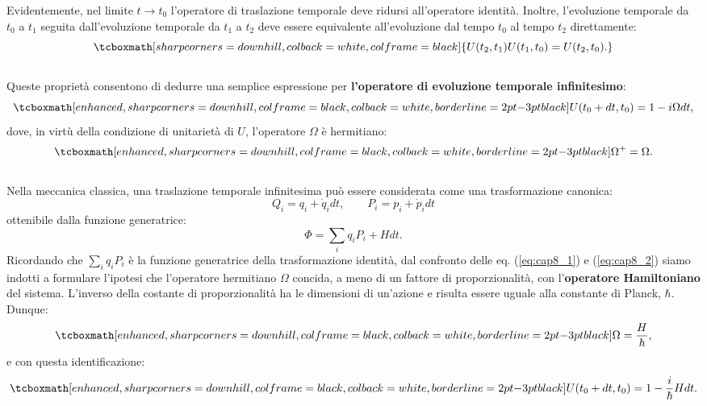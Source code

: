 Evidentemente, nel limite $t\longrightarrow t_0$ l'operatore di traslazione temporale deve ridursi all'operatore identità. Inoltre, l'evoluzione temporale da $t_0$ a $t_1$ seguita dall'evoluzione temporale da $t_1$ a $t_2$ deve essere equivalente all'evoluzione dal tempo $t_0$ al tempo $t_2$ direttamente:
	\begin{equation}
		\tcboxmath[sharp corners=downhill, colback=white, colframe=black]{
			U (t_2,t_1) U(t_1,t_0)=U(t_2,t_0).
			}
	\end{equation}\\
	
Queste proprietà consentono di dedurre una semplice espressione per \textbf{l'operatore di evoluzione temporale infinitesimo}:
	\begin{equation}
		\tcboxmath[enhanced, sharp corners=downhill, colframe=black, colback=white, borderline={2pt}{-3pt}{black}]{
			U(t_0+dt,t_0) = 1-i\Omega dt,
			}
		\label{eq:cap8_1}
	\end{equation}
dove, in virtù della condizione di unitarietà di $U$, l'operatore $\Omega$ è hermitiano:
	\begin{equation}
		\tcboxmath[enhanced, sharp corners=downhill, colframe=black, colback=white, borderline={2pt}{-3pt}{black}]{
			\Omega ^+ = \Omega.
			}
	\end{equation}\\
	
Nella meccanica classica, una traslazione temporale infinitesima può essere considerata come una trasformazione canonica:
\begin{equation}
Q_i = q_i+\dot{q}_idt, \qquad P_i = p_i+\dot{p}_idt
\end{equation}
ottenibile dalla funzione generatrice:
\begin{equation}
\Phi = \sum _i q_iP_i+ Hdt.
\label{eq:cap8_2}
\end{equation}
Ricordando che $\sum _i q_iP_i$ è la funzione generatrice della trasformazione identità, dal confronto delle eq. (\ref{eq:cap8_1}) e (\ref{eq:cap8_2}) siamo indotti a formulare l'ipotesi che l'operatore hermitiano $\Omega$ concida, a meno di un fattore di proporzionalità, con l'\textbf{operatore Hamiltoniano} del sistema. L'inverso della costante di proporzionalità ha le dimensioni di un'azione e risulta essere uguale alla constante di Planck, $\hbar$. Dunque:
	\begin{equation}
		\tcboxmath[enhanced, sharp corners=downhill, colframe=black, colback=white, borderline={2pt}{-3pt}{black}]{
		\Omega = \frac{H}{\hbar},
		}
	\end{equation}
e con questa identificazione:
	\begin{equation}
		\tcboxmath[enhanced, sharp corners=downhill, colframe=black, colback=white, borderline={2pt}{-3pt}{black}]{
			U(t_0+dt,t_0) =1-\frac{i}{\hbar}Hdt.
			}
	\end{equation}
	
